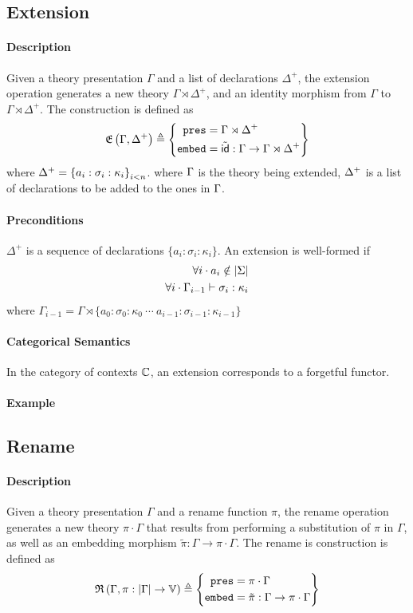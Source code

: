 \subsection{Extension} 
\label{subsec:extension}
\paragraph{Description}
Given a theory presentation $\Gamma$ and a list of declarations $\Delta^+$, the extension operation generates a new theory $\Gamma\rtimes\Delta^+$, and an identity morphism from $\Gamma$ to $\Gamma\rtimes\Delta^+$. 
The construction is defined as
\[\mathfrak{E}\left(\Gamma, \Delta^+\right) \triangleq \left\{ \begin{aligned} \mathtt{pres} & = \Gamma \rtimes \Delta^+ \\ \mathtt{embed} & = \tilde{\mathsf{id}} : \Gamma \rightarrow \Gamma \rtimes \Delta^+ \end{aligned}\right\}\]
\noindent where $\Delta^+ = \left\{a_{i}:\sigma_{i}:\kappa_{i}\right\}_{i<n}$. 
where $\Gamma$ is the theory being extended, $\Delta^+$ is a list of declarations to be added to the ones in $\Gamma$. 

\paragraph{Preconditions}
$\Delta^+$ is a sequence of declarations $\{a_i : \sigma_i : \kappa_{i}\}$. An extension is well-formed if 
\begin{eqnarray}
\forall i \cdot a_i \notin | \Sigma | \\
\forall i \cdot \Gamma_{i-1} \vdash \sigma_i : \kappa_{i}
\end{eqnarray}
where $\Gamma_{i-1} = \Gamma \rtimes \{a_0 : \sigma_0 : \kappa_0\  \cdots \ a_{i-1} : \sigma_{i-1} : \kappa_{i-1}\}$ 

\paragraph{Categorical Semantics}
In the category of contexts $\mathbb{C}$, an extension corresponds to a forgetful functor. 

\paragraph{Example}

\subsection{Rename}
\label{subsec:rename}
\paragraph{Description}
Given a theory presentation $\Gamma$ and a rename function $\pi$, the rename operation generates a new theory $\pi \cdot \Gamma$ that results from performing a substitution of $\pi$ in $\Gamma$, as well as an embedding morphism $\tilde{\pi} : \Gamma \to \pi\cdot\Gamma$. The rename is construction is defined as 
\[ \mathfrak{R}\left(\Gamma, \pi : \left| \Gamma \right| \rightarrow \mathbb{V}\right) \triangleq \left\{\begin{aligned} \mathtt{pres} & = \pi \cdot \Gamma \\ \mathtt{embed} & = \tilde{\pi}:\Gamma \rightarrow \pi\cdot\Gamma \end{aligned}\right\} \]

